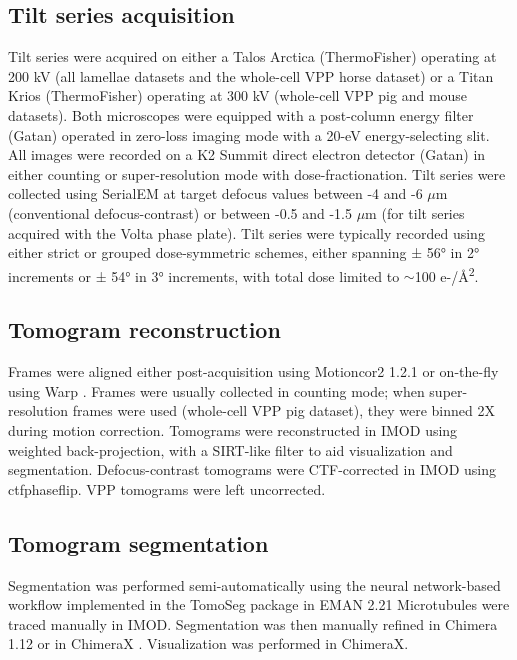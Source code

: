 \subsection*{Tilt series acquisition}
Tilt series were acquired on either a Talos Arctica (ThermoFisher) operating at 200 kV (all lamellae datasets and the whole-cell VPP horse dataset) or a Titan Krios (ThermoFisher) operating at 300 kV (whole-cell VPP pig and mouse datasets). Both microscopes were equipped with a post-column energy filter (Gatan) operated in zero-loss imaging mode with a 20-eV energy-selecting slit. All images were recorded on a K2 Summit direct electron detector (Gatan) in either counting or super-resolution mode with dose-fractionation. Tilt series were collected using SerialEM \cite{Mastronarde2005} at target defocus values between -4 and -6 $\mu$m (conventional defocus-contrast) or between -0.5 and -1.5 $\mu$m (for tilt series acquired with the Volta phase plate). Tilt series were typically recorded using either strict or grouped dose-symmetric schemes, either spanning ± 56° in 2° increments or ± 54° in 3° increments, with total dose limited to $\sim$100 e-/Å\textsuperscript{2}.
%
\subsection*{Tomogram reconstruction}
Frames were aligned either post-acquisition using Motioncor2 1.2.1 \cite{Zheng2017} or on-the-fly using Warp \cite{Tegunov2019}. Frames were usually collected in counting mode; when super-resolution frames were used (whole-cell VPP pig dataset), they were binned 2X during motion correction. Tomograms were reconstructed in IMOD \cite{Kremer1996} using weighted back-projection, with a SIRT-like filter \cite{Zeng2012} to aid visualization and segmentation. Defocus-contrast tomograms were CTF-corrected in IMOD using ctfphaseflip. VPP tomograms were left uncorrected.
%
\subsection*{Tomogram segmentation}
Segmentation was performed semi-automatically using the neural network-based \linebreak workflow implemented in the TomoSeg package in EMAN 2.21 \cite{Chen2017b} Microtubules were traced manually in IMOD. Segmentation was then manually refined in Chimera 1.12 \cite{Pettersen2004} or in ChimeraX \cite{Goddard2018}. Visualization was performed in ChimeraX.
%
